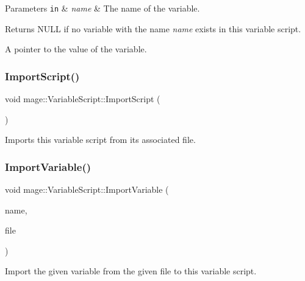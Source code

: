 \begin{DoxyParams}[1]{Parameters}
\mbox{\tt in}  & {\em name} & The name of the variable. \\
\hline
\end{DoxyParams}
\begin{DoxyReturn}{Returns}
{\ttfamily N\+U\+LL} if no variable with the name {\itshape name} exists in this variable script. 

A pointer to the value of the variable. 
\end{DoxyReturn}
\hypertarget{classmage_1_1_variable_script_a5f1cc3bfb611edbc8dfb433ec55cc965}{}\label{classmage_1_1_variable_script_a5f1cc3bfb611edbc8dfb433ec55cc965} 
\subsubsection{\texorpdfstring{Import\+Script()}{ImportScript()}}
{\footnotesize\ttfamily void mage\+::\+Variable\+Script\+::\+Import\+Script (\begin{DoxyParamCaption}{ }\end{DoxyParamCaption})\hspace{0.3cm}{\ttfamily [protected]}}

Imports this variable script from its associated file. \hypertarget{classmage_1_1_variable_script_ae7ab24f4d3bb11579ce9cfb690ba7a4f}{}\label{classmage_1_1_variable_script_ae7ab24f4d3bb11579ce9cfb690ba7a4f} 
\subsubsection{\texorpdfstring{Import\+Variable()}{ImportVariable()}}
{\footnotesize\ttfamily void mage\+::\+Variable\+Script\+::\+Import\+Variable (\begin{DoxyParamCaption}\item[{const string \&}]{name,  }\item[{F\+I\+LE $\ast$}]{file }\end{DoxyParamCaption})\hspace{0.3cm}{\ttfamily [protected]}}

Import the given variable from the given file to this variable script.

